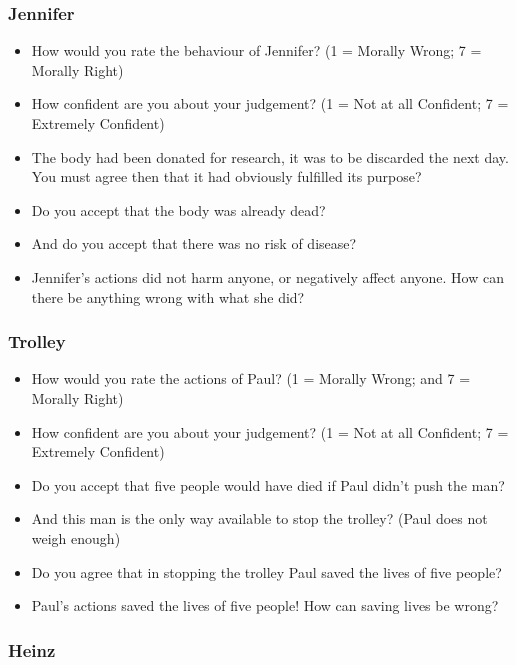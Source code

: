 \documentclass[
  american,
  man,floatsintext]{apa7}
\providecommand{\tightlist}{%
  \setlength{\itemsep}{0pt}\setlength{\parskip}{0pt}}
\begin{document}
\hypertarget{jennifer-1}{%
\subsubsection{Jennifer}\label{jennifer-1}}

\begin{itemize}
\tightlist
\item
  How would you rate the behaviour of Jennifer? (1 = Morally Wrong; 7 = Morally Right)
\item
  How confident are you about your judgement? (1 = Not at all Confident; 7 = Extremely Confident)
\item
  The body had been donated for research, it was to be discarded the next day. You must agree then that it had obviously fulfilled its purpose?
\item
  Do you accept that the body was already dead?
\item
  And do you accept that there was no risk of disease?
\item
  Jennifer's actions did not harm anyone, or negatively affect anyone. How can there be anything wrong with what she did?
\end{itemize}

\hypertarget{trolley-1}{%
\subsubsection{Trolley}\label{trolley-1}}

\begin{itemize}
\tightlist
\item
  How would you rate the actions of Paul? (1 = Morally Wrong; and 7 = Morally Right)
\item
  How confident are you about your judgement? (1 = Not at all Confident; 7 = Extremely Confident)
\item
  Do you accept that five people would have died if Paul didn't push the man?
\item
  And this man is the only way available to stop the trolley? (Paul does not weigh enough)
\item
  Do you agree that in stopping the trolley Paul saved the lives of five people?
\item
  Paul's actions saved the lives of five people! How can saving lives be wrong?
\end{itemize}

\hypertarget{heinz-1}{%
\subsubsection{Heinz}\label{heinz-1}}
\end{document}
